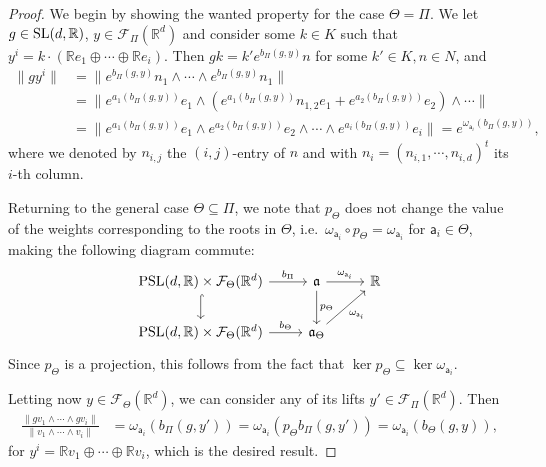 \documentclass{report}
\begin{document}
\begin{proof}
    We begin by showing the wanted property for the case $\Theta = \Pi$.
    We let $g \in \operatorname{{\mathrm{SL}}}(d, \mathbb R)$, $y \in \mathcal F_\Pi(\mathbb R^d)$ and consider some $k\in K$ such that $y^i = k \cdot \left(\mathbb Re_1 \oplus \cdots \oplus \mathbb Re_i\right)$.
    Then $gk = k' e^{b_\Pi(g, y)} n$ for some $k' \in K, n \in N$, and
    \begin{align*}
        \| g y^i \| &=
        \| e^{b_\Pi(g, y)} n_1 \wedge \cdots \wedge e^{b_\Pi(g, y)} n_1 \|\\
        &= \| e^{a_1(b_\Pi(g,y))} e_1 \wedge \left(e^{a_1(b_\Pi(g,y))} n_{1,2} e_1 + e^{a_2(b_\Pi(g,y))} e_2 \right) \wedge  \cdots \|\\
        &= \| e^{a_1(b_\Pi(g,y))} e_1 \wedge e^{a_2(b_\Pi(g,y))} e_2 \wedge  \cdots \wedge e^{a_i(b_\Pi(g,y))} e_i \| = e^{\omega_{\mathsf a_i}(b_\Pi(g,y))},
    \end{align*}
    where we denoted by $n_{i,j}$ the $(i,j)$-entry of $n$ and with $n_i = (n_{i,1}, \cdots, n_{i,d})^t$ its  $i$-th column.

    Returning to the general case $\Theta \subseteq \Pi$, we note that $p_\Theta$ does not change the value of the weights corresponding to the roots in $\Theta$, i.e.\ $\omega_{\mathsf a_i} \circ p_\Theta = \omega_{\mathsf a_i}$ for $\mathsf a_i \in \Theta$, making the following diagram commute:
    \[
        \begin{tikzcd}
        \PSL(d, \mathbb R) \times \mathcal F_\Theta(\mathbb R^d) \arrow[r, "b_\Pi"] \arrow[d, hook] & \mathfrak a \arrow[d, "p_\Theta"] \arrow[r, "\omega_{\mathsf a_i}"] & \mathbb R \\
        \PSL(d, \mathbb R) \times \mathcal F_\Theta(\mathbb R^d) \arrow[r," b_\Theta"] & \mathfrak a_\Theta \arrow{ur}[swap]{\omega_{\mathsf a_i}}
        \end{tikzcd}
    \]
    Since $p_\Theta$ is a projection, this follows from the fact that $\ker p_\Theta \subseteq \ker \omega_{\mathsf a_i}$.

    Letting now $y \in \mathcal F_\Theta(\mathbb R^d)$, we can consider any of its lifts $y' \in \mathcal F_\Pi(\mathbb R^d)$.
    Then
    \begin{align*}
        \frac{ \| gv_1 \wedge \cdots \wedge g v_i \| }{\| v_1 \wedge \cdots \wedge v_i \|} &=
        \omega_{\mathsf a_i}(b_\Pi(g,y')) = \omega_{\mathsf a_i}(p_\Theta b_\Pi(g,y')) =
        \omega_{\mathsf a_i}(b_\Theta(g,y)),
    \end{align*}
    for $y^i = \mathbb Rv_1 \oplus \cdots \oplus \mathbb Rv_i$, 
    which is the desired result.
\end{proof}
\end{document}
